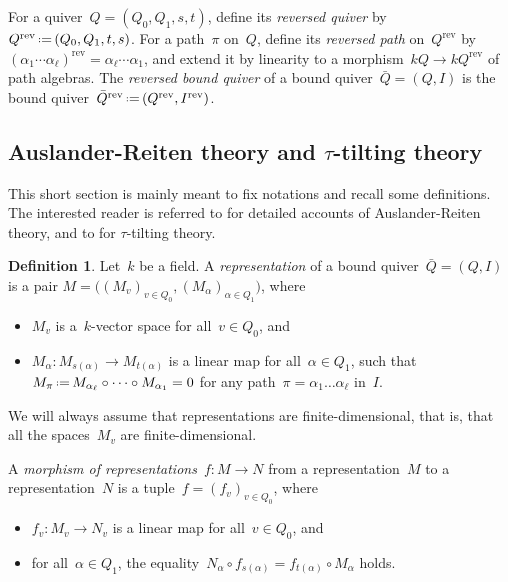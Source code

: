 \documentclass{amsart}
\theoremstyle{definition}
\newtheorem{definition}[theorem]{Definition}
\newcommand{\eqdef}{\mbox{\,\raisebox{0.2ex}{\scriptsize\ensuremath{\mathrm:}}\ensuremath{=}\,}} %
\newcommand{\darkblue}{\color{darkblue}} %
\newcommand{\defn}[1]{\textsl{\darkblue #1}} %
\newcommand{\reversed}[1]{#1^{\mathrm{rev}}} %
\begin{document}
For a quiver~$Q = (Q_0, Q_1, s, t)$, define its \defn{reversed quiver} by~$\reversed{Q} \eqdef (Q_0, Q_1, t, s)$.
For a path~$\pi$ on~$Q$, define its \defn{reversed path} on~$\reversed{Q}$ by~$\reversed{(\alpha_1 \cdots \alpha_\ell)} = \alpha_\ell \cdots \alpha_1$, and extend it by linearity to a morphism~$kQ \to k\reversed{Q}$ of path algebras.
The \defn{reversed bound quiver} of a bound quiver~$\bar Q = (Q,I)$ is the bound quiver~$\reversed{\bar Q} \eqdef (\reversed{Q},\reversed{I})$.

\subsection{Auslander-Reiten theory and $\tau$-tilting theory}
\label{subsec:tautilting}

This short section is mainly meant to fix notations and recall some definitions.  The interested reader is referred to \cite{AssemSimsonSkowronski, Schiffler} for detailed accounts of Auslander-Reiten theory, and to \cite{AdachiIyamaReiten} for $\tau$-tilting theory.

\begin{definition}
Let~$k$ be a field.
A \defn{representation} of a bound quiver~$\bar Q = (Q,I)$ is a pair ${M = \big( (M_v)_{v\in Q_0}, (M_\alpha)_{\alpha\in Q_1} \big)}$, where
\begin{itemize}
\item $M_v$ is a~$k$-vector space for all~$v\in Q_0$, and
\item $M_\alpha: M_{s(\alpha)} \to M_{t(\alpha)}$ is a linear map for all~$\alpha \in Q_1$, such that~$M_\pi \eqdef M_{\alpha_\ell} \circ \dots \circ M_{\alpha_1} = 0$ for any path~$\pi = \alpha_1 \dots \alpha_\ell$ in~$I$.
\end{itemize}
%
We will always assume that representations are finite-dimensional, that is, that all the spaces~$M_v$ are finite-dimensional.

A \defn{morphism of representations}~$f:M\to N$ from a representation~$M$ to a representation~$N$ is a tuple~$f=(f_v)_{v\in Q_0}$, where
\begin{itemize}
\item $f_v:M_v\to N_v$ is a linear map for all~$v\in Q_0$, and
\item for all~$\alpha\in Q_1$, the equality~$N_\alpha \circ f_{s(\alpha)} = f_{t(\alpha)} \circ M_\alpha$ holds.
\end{itemize}
\end{definition}
\end{document}
